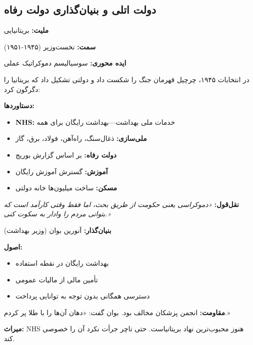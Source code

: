 \subsection{دولت اتلی و بنیان‌گذاری دولت رفاه}

\begin{personbox}

\textbf{ملیت:} بریتانیایی

\textbf{سمت:} نخست‌وزیر (۱۹۴۵-۱۹۵۱)

\textbf{ایده محوری:} سوسیالیسم دموکراتیک عملی

\mediumspace

 در انتخابات ۱۹۴۵، چرچیل قهرمان جنگ را شکست داد و دولتی تشکیل داد که بریتانیا را دگرگون کرد:

\textbf{دستاوردها:}
\begin{itemize}[nosep]
    \item \textbf{NHS:} خدمات ملی بهداشت—بهداشت رایگان برای همه
    \item \textbf{ملی‌سازی:} ذغال‌سنگ، راه‌آهن، فولاد، برق، گاز
    \item \textbf{دولت رفاه:} بر اساس گزارش بوریج
    \item \textbf{آموزش:} گسترش آموزش رایگان
    \item \textbf{مسکن:} ساخت میلیون‌ها خانه دولتی
\end{itemize}

\mediumspace

\textbf{نقل‌قول:} \textit{«دموکراسی یعنی حکومت از طریق بحث، اما فقط وقتی کارآمد است که بتوانی مردم را وادار به سکوت کنی.»}
\end{personbox}

\begin{historybox}
\textbf{بنیان‌گذار:} آنورین بوان (وزیر بهداشت)

\textbf{اصول:}
\begin{itemize}[nosep]
    \item بهداشت رایگان در نقطه استفاده
    \item تأمین مالی از مالیات عمومی
    \item دسترسی همگانی بدون توجه به توانایی پرداخت
\end{itemize}

\textbf{مقاومت:} انجمن پزشکان مخالف بود. بوان گفت: «دهان آن‌ها را با طلا پر کردم.»

\textbf{میراث:} NHS هنوز محبوب‌ترین نهاد بریتانیاست. حتی تاچر جرأت نکرد آن را خصوصی کند.
\end{historybox}

